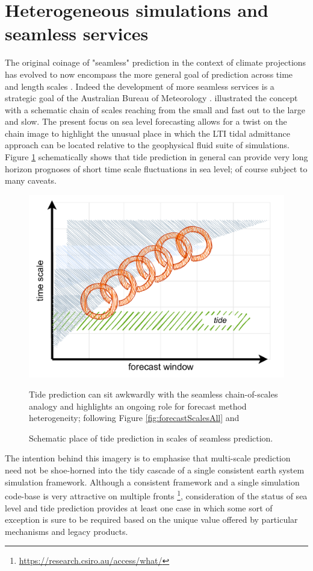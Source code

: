 \section{Heterogeneous simulations and seamless services}
The original coinage of "seamless" prediction in the context of climate projections has evolved to now encompass the more general goal of prediction across time and length scales \citep{10.1127/metz/2020/1048}.
Indeed the development of more seamless services is a strategic goal of the Australian Bureau of Meteorology \citep{BOM2020}.
\citep{10.1175/bams-89-4-459} illustrated the concept with a schematic chain of scales reaching from the small and fast out to the large and slow.
The present focus on sea level forecasting allows for a twist on the chain image to highlight the unusual place in which the LTI tidal admittance approach can be located relative to the geophysical fluid suite of simulations.
Figure \ref{fig:forecastScalesChain} schematically shows that tide prediction in general can provide very long horizon prognoses of short time scale fluctuations in sea level; of course subject to many caveats.
\begin{figure}[h]\centering
        \includegraphics[width=\figwidthFull]{figures/diagrams/scales_with_chain.pdf} 
        \caption{Schematic place of tide prediction in scales of seamless prediction.}
                {Tide prediction can sit awkwardly with the seamless chain-of-scales analogy and highlights an ongoing role for forecast method heterogeneity; following Figure \ref{fig:forecastScalesAll} and \citep{10.1175/bams-89-4-459}}
        \label{fig:forecastScalesChain}
\end{figure}
The intention behind this imagery is to emphasise that multi-scale prediction need not be shoe-horned into the tidy cascade of a single consistent earth system simulation framework.
Although a consistent framework and a single simulation code-base is very attractive on multiple fronts  \footnote{\url{https://research.csiro.au/access/what/}}, consideration of the status of sea level and tide prediction provides at least one case in which some sort of exception is sure to be required based on the unique value offered by particular mechanisms and legacy products.  

